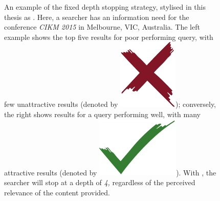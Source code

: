 \begin{figure}[t!]
    \centering
    \caption[Examples of the fixed depth stopping strategy, ]{An example of the fixed depth stopping strategy, stylised in this thesis as . Here, a searcher has an information need for the conference \emph{CIKM 2015} in Melbourne, VIC, Australia. The left example shows the top five results for poor performing query, with few unattractive results (denoted by {\includegraphics[height=\fontcharht\font`\d]{figures/ch0-cross.pdf}}); conversely, the right shows results for a query performing well, with many attractive results (denoted by {\includegraphics[height=\fontcharht\font`\d]{figures/ch0-tick.pdf}}). With , the searcher will stop at a depth of \emph{4,} regardless of the perceived relevance of the content provided.}
    \label{fig:ss1}
\end{figure}

